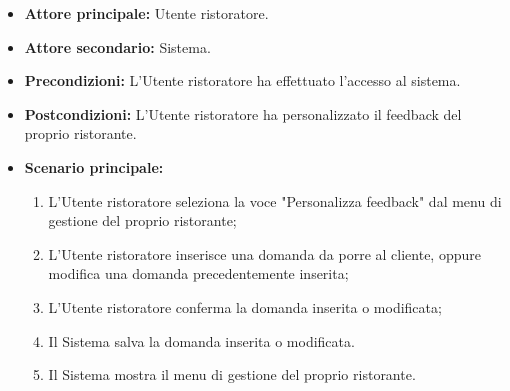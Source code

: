 \label{usecase:Personalizzazione del feedback da parte del business}
\begin{itemize}
	\item \textbf{Attore principale:} Utente ristoratore.

	\item \textbf{Attore secondario:} Sistema.

	\item \textbf{Precondizioni:}
	      L'Utente ristoratore ha effettuato l'accesso al sistema.

	\item \textbf{Postcondizioni:}
	      L'Utente ristoratore ha personalizzato il feedback del proprio
	      ristorante.

	\item \textbf{Scenario principale:}
	      \begin{enumerate}
		      \item L'Utente ristoratore seleziona la voce "Personalizza
		            feedback" dal menu di gestione del proprio ristorante;

		      \item L'Utente ristoratore inserisce una domanda da porre al
		            cliente, oppure modifica una domanda precedentemente
		            inserita;

		      \item L'Utente ristoratore conferma la domanda inserita o
		            modificata;

		      \item Il Sistema salva la domanda inserita o modificata.

		      \item Il Sistema mostra il menu di gestione del proprio
		            ristorante.
	      \end{enumerate}
\end{itemize}

